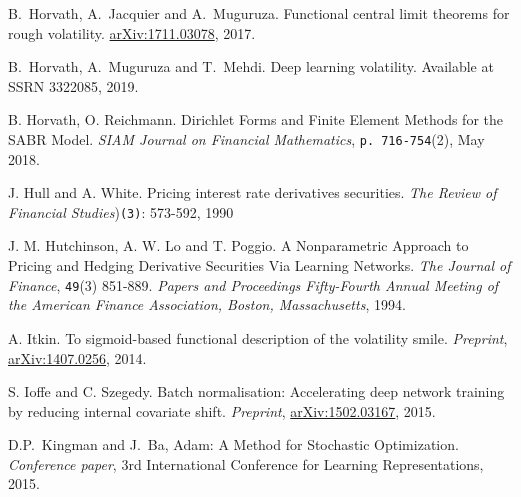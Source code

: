 \documentclass{article}
\theoremstyle{remark}
\begin{document}
\begin{thebibliography}{99}
B.~Horvath, A.~Jacquier and A.~Muguruza.
Functional central limit theorems for rough volatility.
\href{https://arxiv.org/abs/1711.03078}{arXiv:1711.03078}, 2017.

B.~Horvath,  A.~Muguruza and T.~Mehdi.
Deep learning volatility.
Available at SSRN 3322085, 2019.

B. Horvath, O. Reichmann.
Dirichlet Forms and Finite Element Methods for the SABR Model.
\textit{SIAM Journal on Financial Mathematics}, {\tt p. 716-754}(2), May 2018.


J. Hull and A. White. 
Pricing interest rate derivatives securities. 
\textit{The Review of Financial Studies}){\tt(3)}: 573-592, 1990

J. M. Hutchinson, A. W. Lo and T. Poggio.
A Nonparametric Approach to Pricing and Hedging Derivative Securities Via Learning Networks.
\textit{The Journal of Finance}, {\tt 49}(3) 851-889. \textit{Papers and Proceedings Fifty-Fourth Annual Meeting of the American Finance Association, Boston, Massachusetts}, 1994.

 A. Itkin.
To sigmoid-based functional description of the volatility smile.
\textit{Preprint}, \href{https://arxiv.org/pdf/1407.0256.pdf}{arXiv:1407.0256}, 2014. 


S. Ioffe and C. Szegedy.
Batch normalisation: Accelerating deep network training by reducing internal covariate shift. \textit{Preprint}, \href{https://arxiv.org/abs/1502.03167}{arXiv:1502.03167}, 2015.





 D.P.~Kingman and J.~Ba, Adam: A Method for Stochastic Optimization. \textit{Conference paper}, 3rd International Conference for Learning Representations, 2015.




\end{thebibliography}
\end{document}
